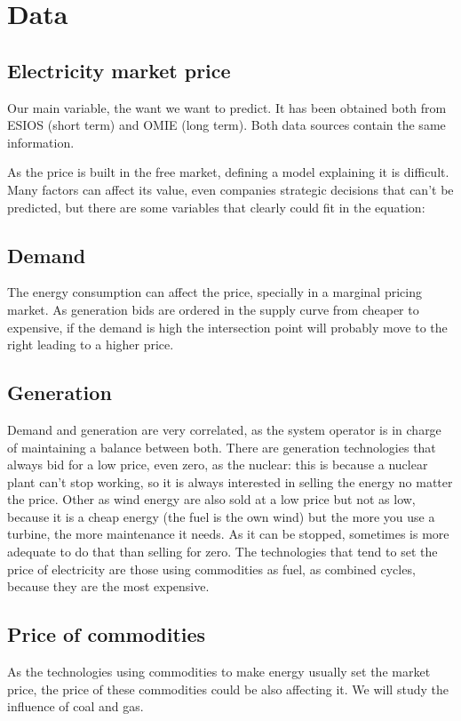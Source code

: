 \section{Data}

\subsection{Electricity market price} Our main variable, the want we want to predict. It has been obtained both from ESIOS (short term) and OMIE (long term). Both data sources contain the same information.



As the price is built in the free market, defining a model explaining it is difficult.
Many factors can affect its value, even companies strategic decisions that can't be predicted, but there are some variables that clearly could fit in the equation: \cite{mercado-electrico-periodico-energia, mercado-electrico-cambio-energetico}

\subsection{Demand} The energy consumption can affect the price, specially in a marginal pricing market. As generation bids are ordered in the supply curve from cheaper to expensive, if the demand is high the intersection point will probably move to the right leading to a higher price.

\subsection{Generation} Demand and generation are very correlated, as the system operator is in charge of maintaining a balance between both. There are generation technologies that always bid for a low price, even zero, as the nuclear: this is because a nuclear plant can't stop working, so it is always interested in selling the energy no matter the price. Other as wind energy are also sold at a low price but not as low, because it is a cheap energy (the fuel is the own wind) but the more you use a turbine, the more maintenance it needs. As it can be stopped, sometimes is more adequate to do that than selling for zero. The technologies that tend to set the price of electricity are those using commodities as fuel, as combined cycles, because they are the most expensive.

\subsection{Price of commodities} As the technologies using commodities to make energy usually set the market price, the price of these commodities could be also affecting it. We will study the influence of coal and gas.

